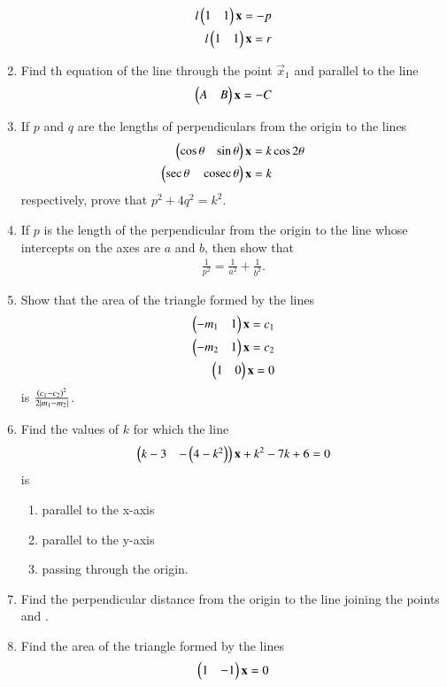 \begin{enumerate}[label=\arabic*.,ref=\thesubsection.\theenumi]
%
\begin{align}
l\begin{pmatrix}1 & 1\end{pmatrix}\mathbf{x} = -p
\\
l\begin{pmatrix}1 & 1\end{pmatrix}\mathbf{x} = r
\end{align}
%
\item Find th equation of the line through the point $\vec{x}_1$ and parallel to the line
%
\begin{align}
\begin{pmatrix}A & B\end{pmatrix}\mathbf{x} = -C
\end{align}
%
\item If $p$ and $q$ are the lengths of perpendiculars from the origin to the lines 
%
\begin{align}
\begin{pmatrix}\cos\theta & \sin\theta\end{pmatrix}\mathbf{x} &= k\cos2\theta
\\
\begin{pmatrix}\sec\theta & \,\text{cosec}\,\theta\end{pmatrix}\mathbf{x} &= k
\end{align}
%
respectively, prove that $p^2+4q^2=k^2$.
\item If $p$ is the length of the perpendicular from the origin to the line whose intercepts on the axes are $a$ and $b$, then show that 
%
\begin{align}
\frac{1}{p^2} = \frac{1}{a^2}+\frac{1}{b^2}.
\end{align}
%
\item Show that the area of the triangle formed by the lines
%
\begin{align}
\begin{pmatrix}-m_1 & 1\end{pmatrix}\mathbf{x} = c_1
\\
\begin{pmatrix}-m_2 & 1\end{pmatrix}\mathbf{x} = c_2
\\
\begin{pmatrix}1 & 0\end{pmatrix}\mathbf{x} = 0
\end{align}
%
is $\frac{\left(c_1-c_2\right)^2}{2\left\vert m_1-m_2\right\vert}$.
\item Find the values of $k$ for which the line 
%
\begin{align}
\begin{pmatrix}k-3 & -\left(4-k^2\right)\end{pmatrix}\mathbf{x} +k^2-7k+6= 0
\end{align}
%
is
\begin{enumerate}
\item parallel to the x-axis
\item parallel to the y-axis
\item passing through the origin.
\end{enumerate}
%
\item Find the perpendicular distance from the origin to the line joining the points \myvec{\cos\theta\sin\theta} and \myvec{\cos\phi \sin \phi}.
\item Find the area of the triangle formed by the lines
%
\begin{align}
\myvec{1 & -1}\vec{x} &= 0
\\

\end{align}
\end{enumerate}
